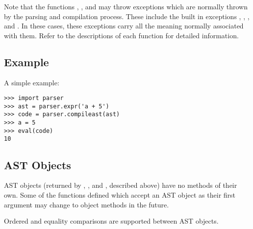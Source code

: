 Note that the functions , , and
 may throw exceptions which are normally thrown by the
parsing and compilation process.  These include the built in
exceptions , ,
, and .  In these cases, these
exceptions carry all the meaning normally associated with them.  Refer
to the descriptions of each function for detailed information.




\subsection{Example}

A simple example:

\begin{verbatim}
>>> import parser
>>> ast = parser.expr('a + 5')
>>> code = parser.compileast(ast)
>>> a = 5
>>> eval(code)
10
\end{verbatim}


\subsection{AST Objects}

AST objects (returned by , , and
, described above) have no methods of their own.
Some of the functions defined which accept an AST object as their
first argument may change to object methods in the future.

Ordered and equality comparisons are supported between AST objects.

\renewcommand{\indexsubitem}{(ast method)}

